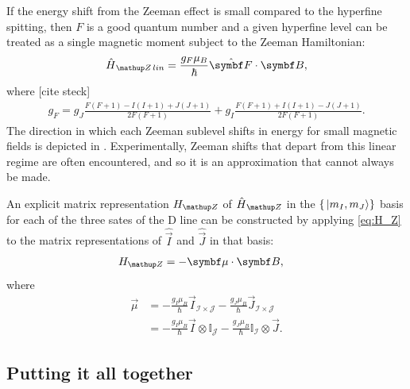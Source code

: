 If the energy shift from the Zeeman effect is small compared to the hyperfine spitting, then $F$ is a good quantum number and a given hyperfine level can be treated as a single magnetic moment subject to the Zeeman Hamiltonian:
\begin{align}
\hat H_\up{Z\,lin} = \frac{g_F\mu_B}{\hbar} \hat{\vec F} \cdot \vec B,
\end{align}
where [cite steck]
\begin{align}
g_F = g_J\frac{F(F+1) - I(I+1) + J(J+1)}{2F(F+1)}
    + g_I\frac{F(F+1) + I(I+1) - J(J+1)}{2F(F+1)}.
\end{align}
The direction in which each Zeeman sublevel shifts in energy for small magnetic fields is depicted in . Experimentally, Zeeman shifts that depart from this linear regime are often encountered, and so it is an approximation that cannot always be made.

An explicit matrix representation $H_\up{Z}$ of $\hat H_\up{Z}$ in the $\{\ket{m_I, m_J}\}$ basis for each of the three sates of the D line can be constructed by applying \eqref{eq:H_Z} to the matrix representations of $\hat{\vec I}$ and $\hat{\vec J}$ in that basis: 
\begin{align}\label{eq:Zeeman_hamiltonian}
H_\up{Z} &= -\vec\mu\cdot \vec B,
\end{align}
where
\begin{align}\label{eq:magnetic_moment_operator}
\vec\mu &=
-\frac{g_I\mu_B}{\hbar} \vec I_{\mathcal{I}\times\mathcal{J}}
- \frac{g_J\mu_B}{\hbar} \vec J_{\mathcal{I}\times\mathcal{J}}\\
&= -\frac{g_I\mu_B}{\hbar} \vec I \otimes \mathbb{I}_{\mathcal{J}}
- \frac{g_J\mu_B}{\hbar} \mathbb{I}_{\mathcal{I}} \otimes \vec J.
\end{align}

\subsection{Putting it all together}

